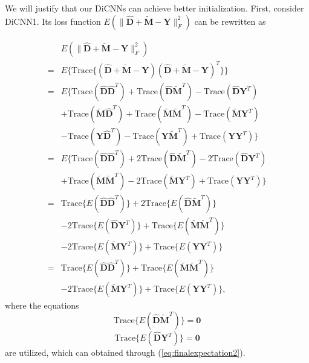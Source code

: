 \documentclass[journal]{IEEEtran}
\begin{document}
We will justify that our DiCNNs can achieve better initialization. First, consider DiCNN1. Its loss function $E(\|\widehat{\mathbf{D}} + \widetilde {\mathbf{M}} - {\mathbf{Y}}\|^2_F)$ can be rewritten as

\begin{equation}
\label{eq:CostInitDICNN1}
\begin{split}
&E(\|\widehat{\mathbf{D}} + \widetilde{\mathbf{M}} - {\mathbf{Y}}\|^2_F)\\
=&E\{\mathrm{Trace}\{(\widehat{\mathbf{D}}+\widetilde{\mathbf{M}}-\mathbf{Y})
(\widehat{\mathbf{D}}+\widetilde{\mathbf{M}}-\mathbf{Y})^T\}\}\\
=&E\{\mathrm{Trace}(\widehat{\mathbf{D}}\widehat{\mathbf{D}}^T)+\mathrm{Trace}(\widehat{\mathbf{D}}\widetilde{\mathbf{M}}^T)-\mathrm{Trace}(\widehat{\mathbf{D}}\mathbf{Y}^T)\\
&+\mathrm{Trace}(\widetilde{\mathbf{M}}\widehat{\mathbf{D}}^T)+\mathrm{Trace}(\widetilde{\mathbf{M}}\widetilde{\mathbf{M}}^T)-\mathrm{Trace}(\widetilde{\mathbf{M}}\mathbf{Y}^T)\\
&-\mathrm{Trace}(\mathbf{Y}\widehat{\mathbf{D}}^T)-\mathrm{Trace}(\mathbf{Y}\widetilde{\mathbf{M}}^T)+\mathrm{Trace}(\mathbf{Y}\mathbf{Y}^T)\}\\
=&E\{\mathrm{Trace}(\widehat{\mathbf{D}}\widehat{\mathbf{D}}^T)+2\mathrm{Trace}(\widehat{\mathbf{D}}\widetilde{\mathbf{M}}^T)-2\mathrm{Trace}(\widehat{\mathbf{D}}\mathbf{Y}^T)\\
&+\mathrm{Trace}(\widetilde{\mathbf{M}}\widetilde{\mathbf{M}}^T)-2\mathrm{Trace}(\widetilde{\mathbf{M}}\mathbf{Y}^T)+\mathrm{Trace}(\mathbf{Y}\mathbf{Y}^T)\}\\
=&\mathrm{Trace}\{E(\widehat{\mathbf{D}}\widehat{\mathbf{D}}^T)\}+2\mathrm{Trace}\{E(\widehat{\mathbf{D}}\widetilde{\mathbf{M}}^T)\}\\
&-2\mathrm{Trace}\{E(\widehat{\mathbf{D}}\mathbf{Y}^T)\}+\mathrm{Trace}\{E(\widetilde{\mathbf{M}}\widetilde{\mathbf{M}}^T)\}\\
&-2\mathrm{Trace}\{E(\widetilde{\mathbf{M}}\mathbf{Y}^T)\}+\mathrm{Trace}\{E(\mathbf{Y}\mathbf{Y}^T)\}\\
=&\mathrm{Trace}\{E(\widehat{\mathbf{D}}\widehat{\mathbf{D}}^T)\}+\mathrm{Trace}\{E(\widetilde {\mathbf{M}}\widetilde {\mathbf{M}}^T)\}\\
&-2\mathrm{Trace}\{E(\widetilde {\mathbf{M}}\mathbf{Y}^T)\}+\mathrm{Trace}\{E(\mathbf{Y}\mathbf{Y}^T)\},
\end{split}
\end{equation}
where the equations
\begin{equation}
\mathrm{Trace}\{E({\widehat{\mathbf{D}}}\widetilde{\mathbf{M}}^T)\}=\textbf{0}
\end{equation}
\begin{equation}
\mathrm{Trace}\{E({\widehat{\mathbf{D}}}\mathbf{Y}^T)\}=\textbf{0}
\end{equation}
are utilized, which can obtained through (\ref{eq:finalexpectation2}).
\end{document}
